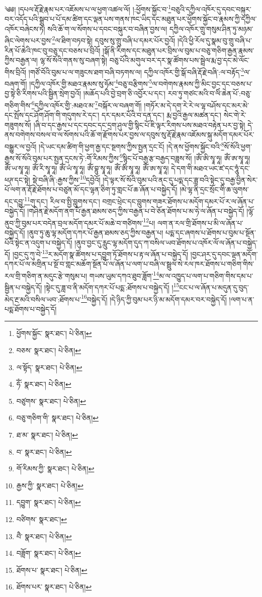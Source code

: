 \setcounter{footnote}{0} 
༄༅། །དཔལ་རྡོ་རྗེ་རྣམ་པར་འཇོམས་པ་ལ་ཕྱག་འཚལ་ལོ། །:ཕྱོགས་སྐྱོང་བ་\footnote{ཕྱོགས་སྐྱོང་  སྣར་ཐང་།  པེ་ཅིན། }བཅུའི་དཀྱིལ་འཁོར་དུ་དབང་བསྐུར་བར་འདོད་པའི་སྒྲུབ་པ་པོ་དམ་ཚིག་དང་ལྡན་པས་གནས་ཁང་ཡིད་དང་མཐུན་པར་ཕྱོགས་སྐྱོང་བ་རྣམས་ཀྱི་དཀྱིལ་འཁོར་བཞེངས་ཏེ། སའི་ཆོ་ག་ལ་སོགས་པ་དབང་བསྐུར་བ་བཞིན་བྱས་ལ། དཀྱིལ་འཁོར་གྲུ་གསུམ་ཤིན་ཏུ་མཉམ་ཞིང་ལེགས་པར་བྱས་\footnote{བཅས་  སྣར་ཐང་།  པེ་ཅིན། }ལ་ཐིག་བཏབ་སྟེ། དབུས་སུ་གྲུ་བཞི་པ་དམར་པོར་བྱའོ། །དེའི་ཕྱི་རོལ་དུ་སྣམ་བུ་གྲུ་བཞི་པ་རིན་པོ་ཆེའི་ཁང་བུ་བཅུ་དང་བཅས་པ་བྲིའོ། །སྒོ་ནི་རིགས་དང་མཐུན་པར་བྲིས་ལ་བུམ་པ་བཅུ་གཅིག་རྒྱན་རྣམས་ཀྱིས་བརྒྱན་ལ། ལྷ་སོ་སོའི་གནས་སུ་བཞག་སྟེ། བཅུ་པོའི་མགུལ་བར་དར་སྣ་ཚོགས་པས་སྦྲེལ་རྨ་བྱ་དང་མེ་ལོང་གིས་བྲིའོ། །གཙོ་བོའི་བུམ་པ་ལ་གཟུངས་ཐག་བཞི་བཏགས་ལ། དཀྱིལ་འཁོར་གྱི་སྒོ་བཞི་རྡོ་རྗེ་བཞི་:ལ་བརྟོད་\footnote{ལ་སྟོད་  སྣར་ཐང་།  པེ་ཅིན། }ལ་བཞག་གོ། །དཀྱིལ་འཁོར་གྱི་མཐའ་རྣམས་སུ་ཧོམ་\footnote{ཧོཾ་  སྣར་ཐང་།  པེ་ཅིན། }བཅུ་བརྩིགས་\footnote{བཙུགས་  སྣར་ཐང་།  པེ་ཅིན། }ལ་བགེགས་རྣམས་ཀྱི་མིང་བྱང་དང་བཅས་པ་བྱ་སྟེ་ཅི་རིགས་པའི་སྦྱིན་སྲེག་བྱའོ། །མཆོད་པའི་བྱེ་བྲག་ཅི་འབྱོར་པ་དང་། རབ་ཏུ་གཙང་མའི་བ་ལིཾ་ཆེན་པོ་:བཅུ་གཅིག་གིས་\footnote{བཅུ་གཅིག་གི་  སྣར་ཐང་།  པེ་ཅིན། }དཀྱིལ་འཁོར་གྱི་:མཐའ་མ་\footnote{ཐ་མ་  སྣར་ཐང་།  པེ་ཅིན། }བསྐོར་ལ་བཞག་གོ། །གཏོར་མ་དེ་དག་རེ་རེ་ལ་ལྷ་བཤོས་དང་མར་མེ་དང་སྤོས་དང་ཤོག་ཤོག་གི་གདུགས་རེ་དང་། དར་དམར་པོའི་བ་དན་དང་། རྨ་བྱའི་རྒྱལ་མཚན་དང་། སེང་གེ་རེ་གཟུགས་སོ། །ཞི་བ་དང་རྒྱས་པ་དང་དབང་དང་དྲག་ཤུལ་གྱི་སྙིང་པོ་ཇི་ལྟར་རིགས་པས་མཐའ་བརྟེན་པར་བྱ་སྟེ། དེ་ནས་བགེགས་བསལ་བ་ལ་སོགས་པའི་ཆོ་ག་རྫོགས་པར་བྱས་ལ་དབུས་སུ་རྡོ་རྗེ་རྣམ་འཇོམས་སྐུ་མདོག་དམར་པོར་བསྒྱུར་ལ་བྱའོ། །དེ་ཡང་དམ་ཚིག་གི་ཕྱག་རྒྱ་དང་སྔགས་ཀྱིས་སྤྱན་དྲང་ངོ། །དེ་ནས་ཕྱོགས་སྐྱོང་བའི་\footnote{བ་  སྣར་ཐང་།  པེ་ཅིན། }སོ་སོའི་ཕྱག་རྒྱས་སོ་སོའི་བུམ་པར་སྤྱན་དྲངས་ཏེ་:གོ་རིམས་ཀྱིས་\footnote{གོ་རིམས་ཀྱི་  སྣར་ཐང་།  པེ་ཅིན། }སྙིང་པོ་བརྒྱ་རྩ་བརྒྱད་བཟླས་སོ། །ཨོཾ་ཨི་སྭཱ་ཧཱ། ཨོཾ་ཨ་སྭཱ་ཧཱ། ཨོཾ་ཡ་སྭཱ་ཧཱ། ཨོཾ་རི་སྭཱ་ཧཱ། ཨོཾ་ཡཾ་སྭཱ་ཧཱ། ཨོཾ་བྷུ་སྭཱ་ཧཱ། ཨོཾ་ཨིཾ་སྭཱ་ཧཱ། ཨོཾ་ཨ་སྭཱ་ཧཱ། དེ་དག་གི་མཐའ་ཡང་ཛ་དང་ཧཱུཾ་དང་ཕཊ་དང་སྟེ། སྡེ་བཞི་ཞི་:རྒྱས་ཀྱིས་\footnote{རྒྱས་ཀྱི་  སྣར་ཐང་།  པེ་ཅིན། }དབྱེའོ། །དེ་ལྟར་སོ་སོའི་བུམ་པའི་ནང་དུ་པདྨ་དང་ཟླ་བའི་སྟེང་དུ་བརྒྱ་བྱིན་སེར་པོ་ལག་ན་རྡོ་རྗེ་ཐོགས་པ་བཙུན་མོ་དང་ལྷན་ཅིག་ཏུ་གླང་པོ་ཆ་ཞོན་པ་བསྐྱེད་དོ། །མེ་ལྷ་ནི་དྲང་སྲོང་གི་ཆ་ལུགས་དང་དབྱུ་\footnote{དབྱུག་  སྣར་ཐང་།  པེ་ཅིན། }གུ་དང་། རིལ་བ་སྤྱི་བླུགས་དང་། བགྲང་ཕྲེང་དང་བླུགས་གཟར་ཐོགས་པ་མདོག་དམར་པོ་ར་ལ་ཞོན་པ་བསྐྱེད་དོ། །གཤིན་རྗེ་མདོག་ནག་པོ་རྒྱན་ཐམས་ཅད་ཀྱིས་བརྒྱན་པ་བེ་ཅོན་ཐོགས་པ་མ་ཧེ་ལ་ཞོན་པ་བསྐྱེད་དོ། །ལྷོ་ནུབ་ཀྱི་བུམ་པར་བདེན་བྲལ་མདོག་དམར་པོ་མཆེ་བ་གཙིགས་\footnote{བཙིགས་  སྣར་ཐང་། }པ། ལག་ན་རལ་གྲི་ཐོགས་པ་མི་ལ་ཞོན་པ་བསྐྱེད་དོ། །ནུབ་ཏུ་ཆུ་ལྷ་མདོག་དཀར་པོ་རྒྱན་ཐམས་ཅད་ཀྱིས་བརྒྱན་པ། པདྨ་དང་ཞགས་པ་ཐོགས་པ་བུམ་པ་སྔོན་པོའི་སྟེང་ན་འདུག་པ་བསྐྱེད་དོ། །ནུབ་བྱང་དུ་རླུང་ལྷ་མདོག་དུད་ཀ་བསིལ་ཡབ་ཐོགས་པ་འཁོར་ལོ་ལ་ཞོན་པ་བསྐྱེད་དོ། །བྱང་དུ་ཀུ་བེ་\footnote{བཻ་  སྣར་ཐང་།  པེ་ཅིན། }ར་མདོག་སྣ་ཚོགས་པ་དབྱུག་ཏོ་ཐོགས་པ་རྟ་ལ་ཞོན་པ་བསྐྱེད་དོ། །བྱང་ཤར་དུ་དབང་ལྡན་མདོག་དཀར་པོ་ལ་མགྲིན་པ་སྔོ་བ་གླང་མཆོག་སྔོན་པོ་ལ་ཞོན་པ་ལག་པ་བཞི་ལ་སྦྲུལ་སེ་རལ་ཁར་ཐོགས་པ་གཅིག་གིས་རལ་གྲི་གཅིག་ན་མདུང་རྩེ་གསུམ་པ། གཡས་ཡུམ་དཀའ་ཐུབ་ཟློག་\footnote{བཟློག་  སྣར་ཐང་།  པེ་ཅིན། }མ་ལ་འཁྱུད་པ་ལག་པ་གཅིག་གིས་དམ་པ་སྦྱིན་པ་བསྐྱེད་དོ། །སྟེང་དུ་ཟླ་བ་ནི་མདོག་དཀར་པོ་པདྨ་:ཐོགས་པ་བསྐྱེད་དོ། །\footnote{ཐོགས་པ་  སྣར་ཐང་།  པེ་ཅིན། }ངང་པ་ལ་ཞོན་པ་མདུན་དུ་བུད་མེད་རྔ་མའི་བསིལ་ཡབ་:ཐོགས་པ་\footnote{ཐོགས་པར་  སྣར་ཐང་།  པེ་ཅིན། }བསྐྱེད་དོ། །དེ་ཉིད་ཀྱི་བུམ་པར་ཉི་མ་མདོག་དམར་བར་བསྐྱེད་དོ། །ལག་པ་ན་པདྨ་ཐོགས་པ་བསྐྱེད་དོ། 